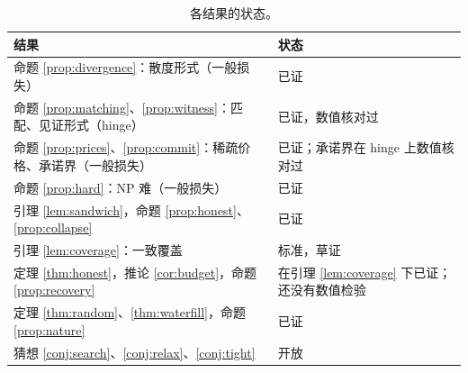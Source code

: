 \documentclass[11pt,a4paper,fontset=none]{ctexart}
\theoremstyle{definition}
\begin{document}
\begin{table}[htbp]
\centering\small
\begin{tabular}{ll}
\toprule
结果 & 状态\\
\midrule
命题 \ref{prop:divergence}：散度形式（一般损失） & 已证\\
命题 \ref{prop:matching}、\ref{prop:witness}：匹配、见证形式（hinge） & 已证，数值核对过\\
命题 \ref{prop:prices}、\ref{prop:commit}：稀疏价格、承诺界（一般损失） & 已证；承诺界在 hinge 上数值核对过\\
命题 \ref{prop:hard}：NP 难（一般损失） & 已证\\
引理 \ref{lem:sandwich}，命题 \ref{prop:honest}、\ref{prop:collapse} & 已证\\
引理 \ref{lem:coverage}：一致覆盖 & 标准，草证\\
定理 \ref{thm:honest}，推论 \ref{cor:budget}，命题 \ref{prop:recovery} & 在引理 \ref{lem:coverage} 下已证；还没有数值检验\\
定理 \ref{thm:random}、\ref{thm:waterfill}，命题 \ref{prop:nature} & 已证\\
猜想 \ref{conj:search}、\ref{conj:relax}、\ref{conj:tight} & 开放\\
\bottomrule
\end{tabular}
\caption{各结果的状态。}
\label{tab:status}
\end{table}

\begingroup\small


\endgroup
\end{document}
